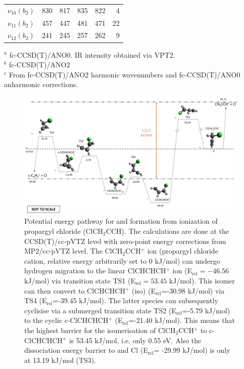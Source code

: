 \begin{table}[ht]
\begin{center}
\begin{tabular}{rrrrrr}
        $\nu_{10}(b_2)$&  830 &  817 &  835 &  822 &   4  \\ %
        $\nu_{11}(b_2)$&  457 &  447 &  481 &  471 &  22  \\ %
        $\nu_{12}(b_2)$&  241 &  245 &  257 &  262 &   9  \\ %
        \bottomrule
        \hline
    \end{tabular}
    \end{center}
    $^a$ fc-CCSD(T)/ANO0. IR intensity obtained via VPT2.\\
    $^b$ fc-CCSD(T)/ANO2\\
    $^c$ From fc-CCSD(T)/ANO2 harmonic wavenumbers and fc-CCSD(T)/ANO0 anharmonic corrections.

\end{table}

\begin{figure}[!ht]
	
	\centering
	\includegraphics[width=1\textwidth]{chapters/C3H3+ and C3D3+/figures/energy_calculation.jpg}

	\caption{
        Potential energy pathway for \cyc and \lin formation from ionization of propargyl chloride (ClCH$_2$CCH). 
        The calculations are done at the CCSD(T)/cc-pVTZ level with zero-point energy corrections from MP2/cc-pVTZ level.
        The ClCH$_2$CCH$^+$ ion (propargyl chloride cation, 
        relative energy arbitrarily set  to 0 kJ/mol) can undergo hydrogen migration to the linear 
        ClCHCHCH$^+$ ion (E$_ \text{rel}=-46.56$ kJ/mol) 
        via transition state TS1 (E$_\text{rel}=53.45$ kJ/mol).
        This isomer can then convert to ClCHCHCH$^+$ (iso) (E$_\text{rel}$=-30.98 kJ/mol) via TS4 (E$_\text{rel}$=-39.45 kJ/mol). 
        The latter species can subsequently cyclisise via a submerged transition state TS2 (E$_\text{rel}$=-5.79 kJ/mol) to the cyclic c-ClCHCHCH$^+$ (E$_\text{rel}$=-21.40 kJ/mol).
        This means that the highest barrier for the isomerisation of ClCH$_2$CCH$^+$ to c-ClCHCHCH$^+$ is 53.45 kJ/mol, i.e. only 0.55 eV. 
        Also the dissociation energy barrier to \cyc and Cl (E$_\text{rel}$= -29.99 kJ/mol) is only at 13.19 kJ/mol (TS3).
    }\label{fig:C3H3+:fig1}
	\label{FIG:energy_comparison}
\end{figure}
